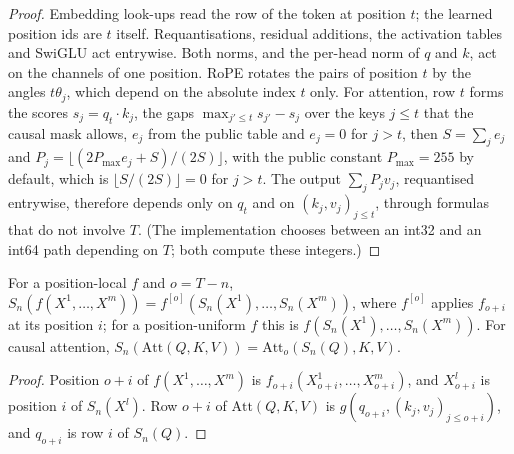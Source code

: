 \begin{proof}
Embedding look-ups read the row of the token at position $t$; the learned position ids are $t$
itself. Requantisations, residual additions, the activation tables and SwiGLU act entrywise. Both
norms, and the per-head norm of $q$ and $k$, act on the channels of one position. RoPE rotates the
pairs of position $t$ by the angles $t\theta_j$, which depend on the absolute index $t$ only. For
attention, row $t$ forms the scores $s_j=q_t\cdot k_j$, the gaps $\max_{j'\le t}s_{j'}-s_j$ over the
keys $j\le t$ that the causal mask allows, $e_j$ from the public table and $e_j=0$ for $j>t$, then
$S=\sum_je_j$ and $P_j=\lfloor(2P_{\max}e_j+S)/(2S)\rfloor$, with the public constant $P_{\max}=255$
by default, which is $\lfloor S/(2S)\rfloor=0$ for $j>t$.
The output $\sum_jP_jv_j$, requantised entrywise, therefore depends only on $q_t$ and on
$(k_j,v_j)_{j\le t}$, through formulas that do not involve $T$. (The implementation chooses between
an int32 and an int64 path depending on $T$; both compute these integers.)
\end{proof}

\begin{lemma}
\label{lem:prune-slice}
For a position-local $f$ and $o=T-n$, $S_n(f(X^1,\dots,X^m))=f^{[o]}(S_n(X^1),\dots,S_n(X^m))$,
where $f^{[o]}$ applies $f_{o+i}$ at its position $i$; for a position-uniform $f$ this is
$f(S_n(X^1),\dots,S_n(X^m))$. For causal attention,
$S_n(\mathrm{Att}(Q,K,V))=\mathrm{Att}_{o}(S_n(Q),K,V)$.
\end{lemma}

\begin{proof}
Position $o+i$ of $f(X^1,\dots,X^m)$ is $f_{o+i}(X^1_{o+i},\dots,X^m_{o+i})$, and $X^l_{o+i}$ is
position $i$ of $S_n(X^l)$. Row $o+i$ of $\mathrm{Att}(Q,K,V)$ is
$g(q_{o+i},(k_j,v_j)_{j\le o+i})$, and $q_{o+i}$ is row $i$ of $S_n(Q)$.
\end{proof}

